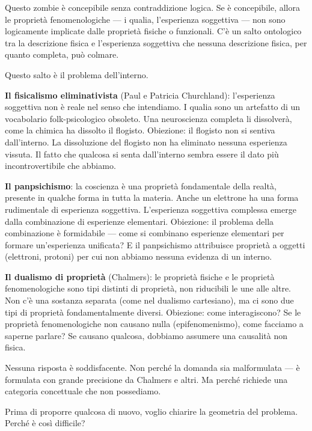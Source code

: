 \documentclass[12pt,a4paper,openany]{book}
\newcommand{\sezione}[1]{\vspace{1.2em}{\large\bfseries #1}\vspace{0.5em}\par}
\begin{document}
Questo zombie è concepibile senza contraddizione logica. Se è concepibile, allora le proprietà fenomenologiche — i qualia, l'esperienza soggettiva — non sono logicamente implicate dalle proprietà fisiche o funzionali. C'è un salto ontologico tra la descrizione fisica e l'esperienza soggettiva che nessuna descrizione fisica, per quanto completa, può colmare.

Questo salto è il problema dell'interno.

\sezione{Le risposte disponibili e i loro limiti}

\textbf{Il fisicalismo eliminativista} (Paul e Patricia Churchland): l'esperienza soggettiva non è reale nel senso che intendiamo. I qualia sono un artefatto di un vocabolario folk-psicologico obsoleto. Una neuroscienza completa li dissolverà, come la chimica ha dissolto il flogisto. Obiezione: il flogisto non si sentiva dall'interno. La dissoluzione del flogisto non ha eliminato nessuna esperienza vissuta. Il fatto che qualcosa si senta dall'interno sembra essere il dato più incontrovertibile che abbiamo.

\textbf{Il panpsichismo}: la coscienza è una proprietà fondamentale della realtà, presente in qualche forma in tutta la materia. Anche un elettrone ha una forma rudimentale di esperienza soggettiva. L'esperienza soggettiva complessa emerge dalla combinazione di esperienze elementari. Obiezione: il problema della combinazione è formidabile — come si combinano esperienze elementari per formare un'esperienza unificata? E il panpsichismo attribuisce proprietà a oggetti (elettroni, protoni) per cui non abbiamo nessuna evidenza di un interno.

\textbf{Il dualismo di proprietà} (Chalmers): le proprietà fisiche e le proprietà fenomenologiche sono tipi distinti di proprietà, non riducibili le une alle altre. Non c'è una sostanza separata (come nel dualismo cartesiano), ma ci sono due tipi di proprietà fondamentalmente diversi. Obiezione: come interagiscono? Se le proprietà fenomenologiche non causano nulla (epifenomenismo), come facciamo a saperne parlare? Se causano qualcosa, dobbiamo assumere una causalità non fisica.

Nessuna risposta è soddisfacente. Non perché la domanda sia malformulata — è formulata con grande precisione da Chalmers e altri. Ma perché richiede una categoria concettuale che non possediamo.

\sezione{La geometria del problema}

Prima di proporre qualcosa di nuovo, voglio chiarire la geometria del problema. Perché è così difficile?
\end{document}
